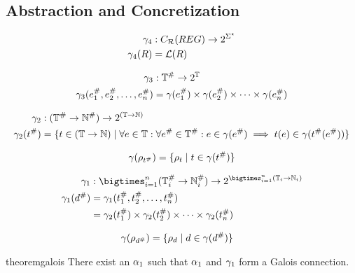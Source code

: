 \subsection{Abstraction and Concretization}\label{subsec:abstraction-and-concretization}

\begin{align}
    \gamma_4 &: C_{\mathcal{R}}(REG) \rightarrow 2^{\Sigma^\star} \\
    \gamma_4(R) &= \mathcal{L}(R)
\end{align}

\begin{align}
    \gamma_3 &: \mathbb{T}^\# \rightarrow 2^\mathbb{T} \\
    \gamma_3 (e_1^\#, e_2^\#, \dots, e_n^\#) &= \gamma(e_1^\#) \times \gamma(e_2^\#) \times \dots \times \gamma(e_n^\#)
\end{align}

\begin{align}
    \gamma_2 &: (\mathbb{T}^\# \rightarrow \mathbb{N}^\#) \rightarrow 2^{(\mathbb{T} \rightarrow \mathbb{N})} \\
    \gamma_2(t^\#) &= \{t \in (\mathbb{T} \rightarrow \mathbb{N}) \mid \forall e \in \mathbb{T} : \forall e^\# \in \mathbb{T}^\# : e \in \gamma(e^\#) \implies t(e) \in \gamma(t^\#(e^\#))\}
\end{align}

\begin{align}
    \gamma(\rho_{t^\#}) = \{ \rho_{t} \mid t \in \gamma(t^\#) \}
\end{align}

\begin{align}
    \concrete_1 &: \bigtimes_{i = 1}^{n} (\mathbb{T}^\#_i \rightarrow \mathbb{N}^\#_i) \rightarrow 2^{\bigtimes_{i = 1}^{n} (\mathbb{T}_i \rightarrow \mathbb{N}_i)} \\
    \concrete_1(d^\#) &= \concrete_1(t_1^\#, t_2^\#, \dots, t_n^\#) \\
                    &= \concrete_2(t_1^\#) \times \concrete_2(t_2^\#) \times \dots \times \concrete_2(t_n^\#)
\end{align}

\begin{align}
    \gamma(\rho_{d^\#}) &= \{ \rho_{d} \mid d \in \gamma(d^\#) \}
\end{align}

\begin{restatable}{theorem}{galois}\label{thm:galios}
    There exist an $\alpha_1$ such that $\alpha_1$ and $\gamma_1$ form a Galois connection.
\end{restatable}
